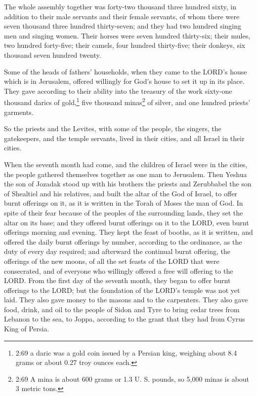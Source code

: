 \myverse{}The whole assembly together was forty-two thousand three hundred
sixty,
\myverse{}in addition to their male servants and their female servants, of whom there
were seven thousand three hundred thirty-seven; and they had two hundred singing men and singing women.
\myverse{}Their horses were seven hundred thirty-six; their mules, two hundred forty-five;
\myverse{}their camels, four hundred thirty-five; their donkeys, six thousand seven
hundred twenty.

\myverse{}Some of the heads of fathers’ households, when they came to the
LORD’s house which is in Jerusalem, offered willingly for God’s house to set it up in its place.
\myverse{}They gave according to their ability into the treasury of the work sixty-one
thousand darics of gold,\footnote{2:69 a daric was a gold coin issued by a Persian king, weighing about 8.4 grams or about 0.27 troy
	ounces each.} five thousand minas\footnote{2:69 A mina is about 600 grams or 1.3 U. S. pounds, so 5,000 minas is about 3 metric tons.}
of silver, and one hundred priests’ garments.

\myverse{}So the priests and the Levites, with some of the people, the
singers, the gatekeepers, and the temple servants, lived in their cities, and all Israel in their cities.


\mychapter{} \myverse*{}When the seventh month had come, and the children of Israel were
in the cities, the people gathered themselves together as one man to Jerusalem.
\myverse{}Then Yeshua the son of Jozadak stood up with his brothers the priests and Zerubbabel
the son of Shealtiel and his relatives, and built the altar of the God of Israel, to offer burnt offerings
on it, as it is written in the Torah of Moses the man of God.
\myverse{}In spite of their fear because of the peoples of the surrounding lands, they
set the altar on its base; and they offered burnt offerings on it to the LORD, even burnt offerings morning
and evening.
\myverse{}They kept the feast of booths, as it is written, and offered the daily burnt
offerings by number, according to the ordinance, as the duty of every day required;
\myverse{}and afterward the continual burnt offering, the offerings of the new moons,
of all the set feasts of the LORD that were consecrated, and of everyone who willingly offered a free
will offering to the LORD.
\myverse{}From the first day of the seventh month, they began to offer burnt offerings
to the LORD; but the foundation of the LORD’s temple was not yet laid.
\myverse{}They also gave money to the masons and to the carpenters. They also gave food,
drink, and oil to the people of Sidon and Tyre to bring cedar trees from Lebanon to the sea, to Joppa,
according to the grant that they had from Cyrus King of Persia.

